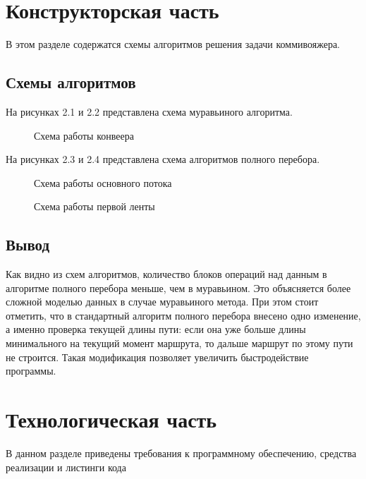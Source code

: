 \documentclass[a4paper,12pt]{report}
\begin{document}
\chapter{Конструкторская часть}
\hspace{0.6cm}В этом разделе содержатся схемы алгоритмов решения задачи коммивояжера.

\section{Схемы алгоритмов}

\hspace{0.6cm}На рисунках 2.1 и 2.2 представлена схема муравьиного алгоритма.

\begin{figure}[ht!]
\caption{Схема работы конвеера}
\end{figure}

\newpage

На рисунках 2.3  и 2.4 представлена схема алгоритмов полного перебора.

\begin{figure}[ht!]
\caption{Схема работы основного потока}
\end{figure}

\newpage

\begin{figure}[ht!]
\caption{Схема работы первой ленты}
\end{figure}

\section{Вывод}
Как видно из схем алгоритмов, количество блоков операций над данным в алгоритме полного перебора меньше, чем в муравьином. Это объясняется более сложной моделью данных в случае муравьиного метода. При этом стоит отметить, что в стандартный алгоритм полного перебора внесено одно изменение, а именно проверка текущей длины пути: если она уже больше длины минимального на текущий момент маршрута, то дальше маршрут по этому пути не строится. Такая модификация позволяет увеличить быстродействие программы.

\chapter{Технологическая часть}
\hspace{0.6cm}В данном разделе приведены требования к программному обеспечению, средства реализации и листинги кода
\end{document}
